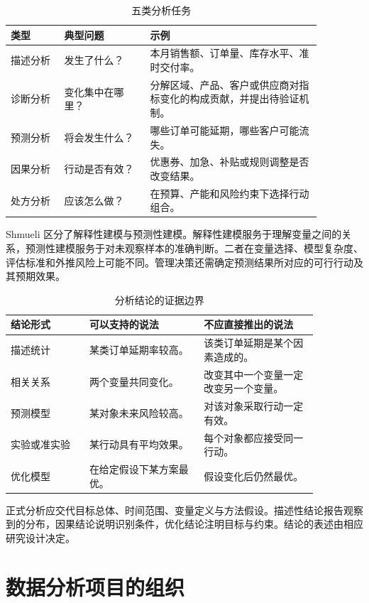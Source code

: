 \begin{table}[htbp]
\centering
\caption{五类分析任务}
\begin{tabular}{P{0.15\linewidth}P{0.24\linewidth}P{0.48\linewidth}}
\toprule
{}
类型 & 典型问题 & 示例\\
\midrule
描述分析 & 发生了什么？ & 本月销售额、订单量、库存水平、准时交付率。\\
诊断分析 & 变化集中在哪里？ & 分解区域、产品、客户或供应商对指标变化的构成贡献，并提出待验证机制。\\
预测分析 & 将会发生什么？ & 哪些订单可能延期，哪些客户可能流失。\\
因果分析 & 行动是否有效？ & 优惠券、加急、补贴或规则调整是否改变结果。\\
处方分析 & 应该怎么做？ & 在预算、产能和风险约束下选择行动组合。\\
\bottomrule
\end{tabular}
\end{table}

Shmueli 区分了解释性建模与预测性建模。解释性建模服务于理解变量之间的关系，预测性建模服务于对未观察样本的准确判断。二者在变量选择、模型复杂度、评估标准和外推风险上可能不同。管理决策还需确定预测结果所对应的可行行动及其预期效果。

\begin{table}[htbp]
\centering
\caption{分析结论的证据边界}
\begin{tabular}{P{0.22\linewidth}P{0.32\linewidth}P{0.32\linewidth}}
\toprule
{}
结论形式 & 可以支持的说法 & 不应直接推出的说法\\
\midrule
描述统计 & 某类订单延期率较高。 & 该类订单延期是某个因素造成的。\\
相关关系 & 两个变量共同变化。 & 改变其中一个变量一定改变另一个变量。\\
预测模型 & 某对象未来风险较高。 & 对该对象采取行动一定有效。\\
实验或准实验 & 某行动具有平均效果。 & 每个对象都应接受同一行动。\\
优化模型 & 在给定假设下某方案最优。 & 假设变化后仍然最优。\\
\bottomrule
\end{tabular}
\end{table}

正式分析应交代目标总体、时间范围、变量定义与方法假设。描述性结论报告观察到的分布，因果结论说明识别条件，优化结论注明目标与约束。结论的表述由相应研究设计决定。

\section{数据分析项目的组织}

